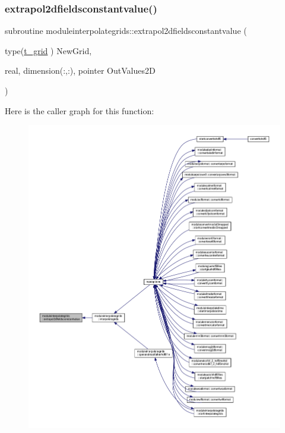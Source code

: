\subsubsection{\texorpdfstring{extrapol2dfieldsconstantvalue()}{extrapol2dfieldsconstantvalue()}}
{\footnotesize\ttfamily subroutine moduleinterpolategrids\+::extrapol2dfieldsconstantvalue (\begin{DoxyParamCaption}\item[{type(\mbox{\hyperlink{structmoduleinterpolategrids_1_1t__grid}{t\+\_\+grid}} )}]{New\+Grid,  }\item[{real, dimension(\+:,\+:), pointer}]{Out\+Values2D }\end{DoxyParamCaption})\hspace{0.3cm}{\ttfamily [private]}}

Here is the caller graph for this function\+:\nopagebreak
\begin{figure}[H]
\begin{center}
\leavevmode
\includegraphics[width=350pt]{namespacemoduleinterpolategrids_a57274a0561d59adfc89dec77051df3e4_icgraph}
\end{center}
\end{figure}
\mbox{\label{namespacemoduleinterpolategrids_a6f499d806252d62f33788a8d02639319}} 
